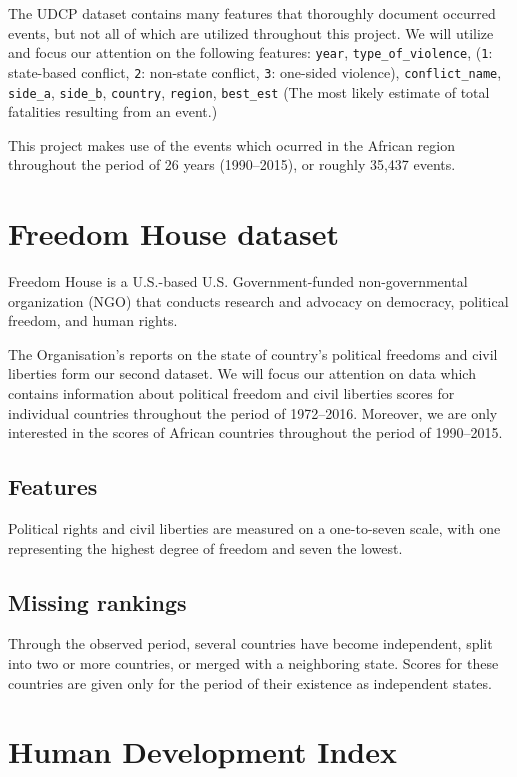 \documentclass[a4paper,11pt]{article}
\begin{document}
The UDCP dataset contains many features that thoroughly document occurred
events, but not all of which are utilized throughout this project. We
will utilize and focus our attention on the following features: 
\texttt{year}, \texttt{type\_of\_violence},
(\texttt{1}: state-based conflict, \texttt{2}: non-state conflict, \texttt{3}: one-sided violence),
\texttt{conflict\_name}, \texttt{side\_a}, \texttt{side\_b}, \texttt{country}, \texttt{region},
\texttt{best\_est} (The most likely estimate of total fatalities resulting from an event.)

This project makes use of the events which ocurred in the African region
throughout the period of 26 years (1990--2015), or roughly 35,437 events.

\section{Freedom House dataset}

Freedom House is a U.S.-based U.S. Government-funded non-governmental
organization (NGO) that conducts research and advocacy on democracy,
political freedom, and human rights.

The Organisation's reports on the state of country's political freedoms and
civil liberties form our second dataset.
We will focus our attention on data
which contains information about political freedom and civil liberties
scores for individual countries throughout the period of 1972--2016.
Moreover, we are only interested in the scores of African countries
throughout the period of 1990--2015.

\subsection{Features}

Political rights and civil liberties are measured on a one-to-seven
scale, with one representing the highest degree of freedom and seven the
lowest.

\subsection{Missing rankings}

Through the observed period, several countries have become independent,
split into two or more countries, or merged with a neighboring state.
Scores for these countries are given only for the period of their
existence as independent states.

\section{Human Development Index}
\end{document}
